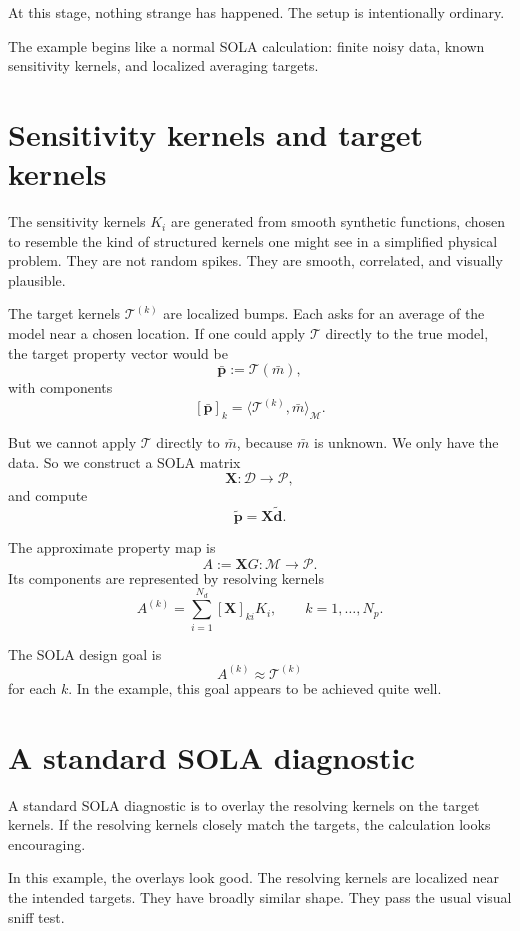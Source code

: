 \documentclass[11pt,openany]{book}
\theoremstyle{definition}
\theoremstyle{remark}
\newcommand{\M}{\mathcal M}
\newcommand{\D}{\mathcal D}
\newcommand{\Pspace}{\mathcal P}
\newcommand{\Tau}{\mathcal{T}}
\begin{document}
At this stage, nothing strange has happened. The setup is intentionally ordinary.

\begin{checkpointbox}
The example begins like a normal SOLA calculation: finite noisy data, known sensitivity kernels,
and localized averaging targets.
\end{checkpointbox}

\section{Sensitivity kernels and target kernels}

The sensitivity kernels \(K_i\) are generated from smooth synthetic functions, chosen to resemble
the kind of structured kernels one might see in a simplified physical problem. They are not
random spikes. They are smooth, correlated, and visually plausible.

The target kernels \(\mathcal T^{(k)}\) are localized bumps. Each asks for an average of the model
near a chosen location. If one could apply \(\Tau\) directly to the true model, the target property
vector would be
\[
  \bar{\mathbf p}
  :=
  \Tau(\bar m),
\]
with components
\[
  [\bar{\mathbf p}]_k
  =
  \langle \mathcal T^{(k)},\bar m\rangle_{\M}.
\]

But we cannot apply \(\Tau\) directly to \(\bar m\), because \(\bar m\) is unknown. We only have
the data. So we construct a SOLA matrix
\[
  \mathbf X:\D\to\Pspace,
\]
and compute
\[
  \widetilde{\mathbf p}
  =
  \mathbf X\widetilde{\mathbf d}.
\]

The approximate property map is
\[
  A:=\mathbf XG:\M\to\Pspace.
\]
Its components are represented by resolving kernels
\[
  A^{(k)}
  =
  \sum_{i=1}^{N_d}[\mathbf X]_{ki}K_i,
  \qquad k=1,\dots,N_p.
\]

The SOLA design goal is
\[
  A^{(k)}\approx \mathcal T^{(k)}
\]
for each \(k\). In the example, this goal appears to be achieved quite well.

\section{A standard SOLA diagnostic}

A standard SOLA diagnostic is to overlay the resolving kernels on the target kernels. If the
resolving kernels closely match the targets, the calculation looks encouraging.

In this example, the overlays look good. The resolving kernels are localized near the intended
targets. They have broadly similar shape. They pass the usual visual sniff test.
\end{document}
